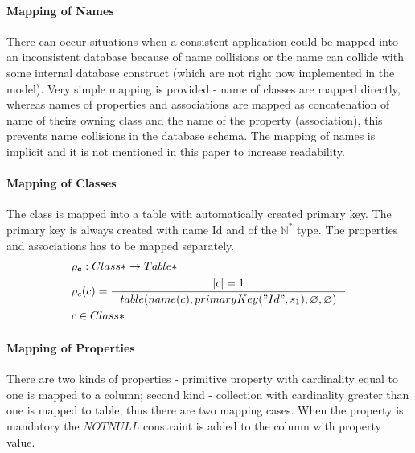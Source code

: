 \documentclass[11pt]{article}
\begin{document}
\paragraph{Mapping of Names} There can occur situations when a consistent application could be mapped into an inconsistent database because of name collisions or the name can collide with some internal database construct (which are not right now implemented in the model). Very simple mapping is provided - name of classes are mapped directly, whereas names of properties and associations are mapped as concatenation of name of theirs owning class and the name of the property (association), this prevents name collisions in the database schema. The mapping of names is implicit and it is not mentioned in this paper to increase readability.



\paragraph{Mapping of Classes} The class is mapped into a table with  automatically created primary key. The primary key is always created with name Id and of the $\mathbb{N^{*}}$ type. The properties and associations has to be mapped separately.
\begin{align*}
&	\mathbf{\rho_{c}} : Class*  \rightarrow Table* \\
&	\rho_{c}(c) = %
		\inference{|c| = 1}{table(name(c), primaryKey("Id", s_1), \varnothing, \varnothing)} %
\\ 	
& c \in Class*
\end{align*}

\paragraph{Mapping of Properties}
There are two kinds of properties - primitive property with cardinality equal to one is mapped to a column; second kind - collection with cardinality greater than one is mapped to table, thus there are two mapping cases. When the property is mandatory the $NOTNULL$ constraint is added to the column with property value. 
\end{document}

